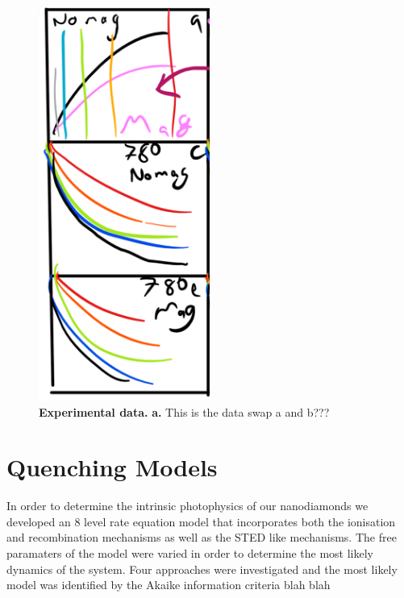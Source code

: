 \documentclass[preprint,prl,twocolumn]{revtex4}
\begin{document}
\begin{figure}[H]
  \centering
  \includegraphics[width=0.5\textwidth]{Data2.png} 
 \caption{\textbf{Experimental data.} \textbf{a.} This is the data swap a and b???} \label{FigData}
\end{figure}



\section{Quenching Models}


In order to determine the intrinsic photophysics of our nanodiamonds we developed an 8 level rate equation model that incorporates both the ionisation and recombination mechanisms as well as the STED like mechanisms. The free paramaters of the model were varied in order to determine the most likely dynamics of the system. Four approaches were investigated and the most likely model was identified by the Akaike information criteria blah blah
\end{document}
